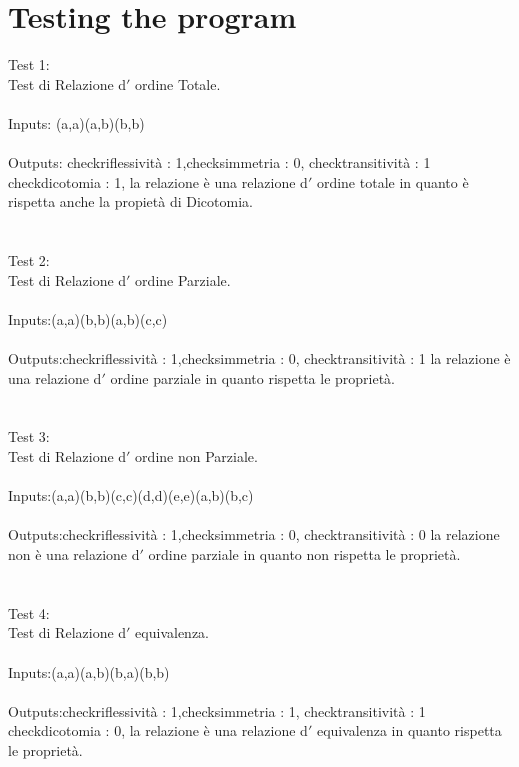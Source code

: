 \documentclass[11pt, a4paper, titlepage, block]{article}
\begin{document}
	\section{Testing the program}
	Test 1:\\
	Test di Relazione d$'$ ordine Totale.\\
	\\
	Inputs: (a,a)(a,b)(b,b)\\
	\\
	Outputs: checkriflessivit\`a : 1,checksimmetria : 0, checktransitivit\`a : 1
	checkdicotomia : 1, la relazione \`e una relazione d$'$ ordine totale in quanto \`e rispetta anche la propiet\`a di Dicotomia.\\
	\\
	\\
	Test 2: \\
	Test di Relazione d$'$ ordine Parziale.\\
	\\
	Inputs:(a,a)(b,b)(a,b)(c,c)\\
	\\
	Outputs:checkriflessivit\`a : 1,checksimmetria : 0, checktransitivit\`a : 1
	la relazione \`e una relazione d$'$ ordine parziale in quanto rispetta le propriet\`a.\\
	\\
	\\
	Test 3: \\
	Test di Relazione d$'$ ordine non Parziale.\\
	\\
	Inputs:(a,a)(b,b)(c,c)(d,d)(e,e)(a,b)(b,c)\\
	\\
	Outputs:checkriflessivit\`a : 1,checksimmetria : 0, checktransitivit\`a : 0
	la relazione non \`e una relazione d$'$ ordine parziale in quanto non rispetta le propriet\`a.\\
	\\
	\\
	Test 4:\\
	Test di Relazione d$'$ equivalenza.\\
	\\
	Inputs:(a,a)(a,b)(b,a)(b,b)\\
	\\
	Outputs:checkriflessivit\`a : 1,checksimmetria : 1, checktransitivit\`a : 1
	checkdicotomia : 0, la relazione \`e una relazione d$'$ equivalenza in quanto rispetta le propriet\`a.\\
	\\
	\\
\end{document}
